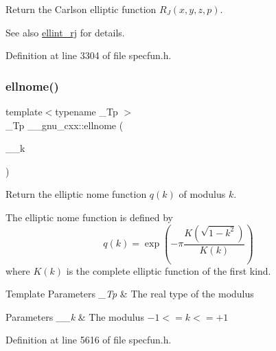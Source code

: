 Return the Carlson elliptic function $ R_J(x,y,z,p) $.

\begin{DoxySeeAlso}{See also}
\hyperlink{group__gnu__math__spec__func_gadccabc8df929cc03745286ed1574a3ba}{ellint\+\_\+rj} for details. 
\end{DoxySeeAlso}


Definition at line 3304 of file specfun.\+h.

\mbox{\label{group__gnu__math__spec__func_ga7bfb34f8b5c0ed7c72040f9cb7034bba}} 
\subsubsection{\texorpdfstring{ellnome()}{ellnome()}}
{\footnotesize\ttfamily template$<$typename \+\_\+\+Tp $>$ \\
\+\_\+\+Tp \+\_\+\+\_\+gnu\+\_\+cxx\+::ellnome (\begin{DoxyParamCaption}\item[{\+\_\+\+Tp}]{\+\_\+\+\_\+k }\end{DoxyParamCaption})\hspace{0.3cm}{\ttfamily [inline]}}

Return the elliptic nome function $ q(k) $ of modulus $ k $.

The elliptic nome function is defined by \[ q(k) = \exp \left(-\pi\frac{K(\sqrt{1-k^2})}{K(k)} \right) \] where $ K(k) $ is the complete elliptic function of the first kind.


\begin{DoxyTemplParams}{Template Parameters}
{\em \+\_\+\+Tp} & The real type of the modulus \\
\hline
\end{DoxyTemplParams}

\begin{DoxyParams}{Parameters}
{\em \+\_\+\+\_\+k} & The modulus $ -1 <= k <= +1 $ \\
\hline
\end{DoxyParams}


Definition at line 5616 of file specfun.\+h.

\mbox{\label{group__gnu__math__spec__func_gad3ba08e5843ea0ec2bb9ddde3033adff}} 
